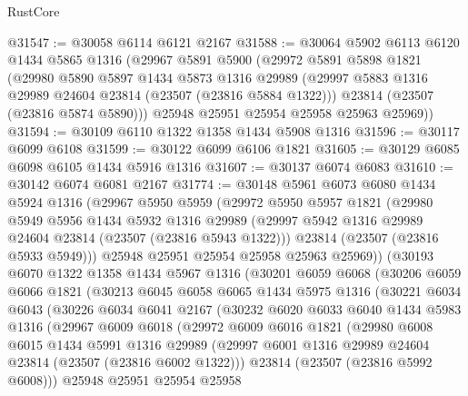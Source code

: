 \begin{lexlean}{RustCore}
\begin{coremodule}
@31547 := @30058 @6114 @6121 @2167
@31588 := @30064
    @5902
    @6113
    @6120
    @1434
    @5865
    @1316
    (@29967
      @5891
      @5900
      (@29972
        @5891
        @5898
        @1821
        (@29980
          @5890
          @5897
          @1434
          @5873
          @1316
          @29989
          (@29997 @5883 @1316 @29989 @24604 @23814 (@23507 (@23816 @5884 @1322)))
          @23814
          (@23507 (@23816 @5874 @5890)))
        @25948
        @25951
        @25954
        @25958
        @25963
        @25969))
@31594 := @30109 @6110 @1322 @1358 @1434 @5908 @1316
@31596 := @30117 @6099 @6108
@31599 := @30122 @6099 @6106 @1821
@31605 := @30129 @6085 @6098 @6105 @1434 @5916 @1316
@31607 := @30137 @6074 @6083
@31610 := @30142 @6074 @6081 @2167
@31774 := @30148
    @5961
    @6073
    @6080
    @1434
    @5924
    @1316
    (@29967
      @5950
      @5959
      (@29972
        @5950
        @5957
        @1821
        (@29980
          @5949
          @5956
          @1434
          @5932
          @1316
          @29989
          (@29997 @5942 @1316 @29989 @24604 @23814 (@23507 (@23816 @5943 @1322)))
          @23814
          (@23507 (@23816 @5933 @5949)))
        @25948
        @25951
        @25954
        @25958
        @25963
        @25969))
    (@30193
      @6070
      @1322
      @1358
      @1434
      @5967
      @1316
      (@30201
        @6059
        @6068
        (@30206
          @6059
          @6066
          @1821
          (@30213
            @6045
            @6058
            @6065
            @1434
            @5975
            @1316
            (@30221
              @6034
              @6043
              (@30226
                @6034
                @6041
                @2167
                (@30232
                  @6020
                  @6033
                  @6040
                  @1434
                  @5983
                  @1316
                  (@29967
                    @6009
                    @6018
                    (@29972
                      @6009
                      @6016
                      @1821
                      (@29980
                        @6008
                        @6015
                        @1434
                        @5991
                        @1316
                        @29989
                        (@29997 @6001 @1316 @29989 @24604 @23814 (@23507 (@23816 @6002 @1322)))
                        @23814
                        (@23507 (@23816 @5992 @6008)))
                      @25948
                      @25951
                      @25954
                      @25958

\end{coremodule}
\end{lexlean}
